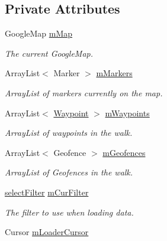 \subsection*{Private Attributes}
\begin{DoxyCompactItemize}
\item 
Google\+Map \hyperlink{classuk_1_1ac_1_1swan_1_1digitaltrails_1_1activities_1_1_map_activity_ad896b1298670b4e3492d5dcfe27842b3}{m\+Map}
\begin{DoxyCompactList}\small\item\em The current Google\+Map. \end{DoxyCompactList}\item 
Array\+List$<$ Marker $>$ \hyperlink{classuk_1_1ac_1_1swan_1_1digitaltrails_1_1activities_1_1_map_activity_a8791c1ad2e01e21fa9315567585e9d58}{m\+Markers}
\begin{DoxyCompactList}\small\item\em Array\+List of markers currently on the map. \end{DoxyCompactList}\item 
Array\+List$<$ \hyperlink{classuk_1_1ac_1_1swan_1_1digitaltrails_1_1components_1_1_waypoint}{Waypoint} $>$ \hyperlink{classuk_1_1ac_1_1swan_1_1digitaltrails_1_1activities_1_1_map_activity_ae044f1c724b13a91aebfe131f341afe2}{m\+Waypoints}
\begin{DoxyCompactList}\small\item\em Array\+List of waypoints in the walk. \end{DoxyCompactList}\item 
Array\+List$<$ Geofence $>$ \hyperlink{classuk_1_1ac_1_1swan_1_1digitaltrails_1_1activities_1_1_map_activity_a4a542ad132ee9f0492261930aca8164f}{m\+Geofences}
\begin{DoxyCompactList}\small\item\em Array\+List of Geofences in the walk. \end{DoxyCompactList}\item 
\hyperlink{enumuk_1_1ac_1_1swan_1_1digitaltrails_1_1activities_1_1_map_activity_1_1select_filter}{select\+Filter} \hyperlink{classuk_1_1ac_1_1swan_1_1digitaltrails_1_1activities_1_1_map_activity_a554023fa57db99ba95741de26b0ce17b}{m\+Cur\+Filter}
\begin{DoxyCompactList}\small\item\em The filter to use when loading data. \end{DoxyCompactList}\item 
Cursor \hyperlink{classuk_1_1ac_1_1swan_1_1digitaltrails_1_1activities_1_1_map_activity_a31da11ed7d3bdcbe56d3be36c4dc8014}{m\+Loader\+Cursor}

\end{DoxyCompactItemize}
